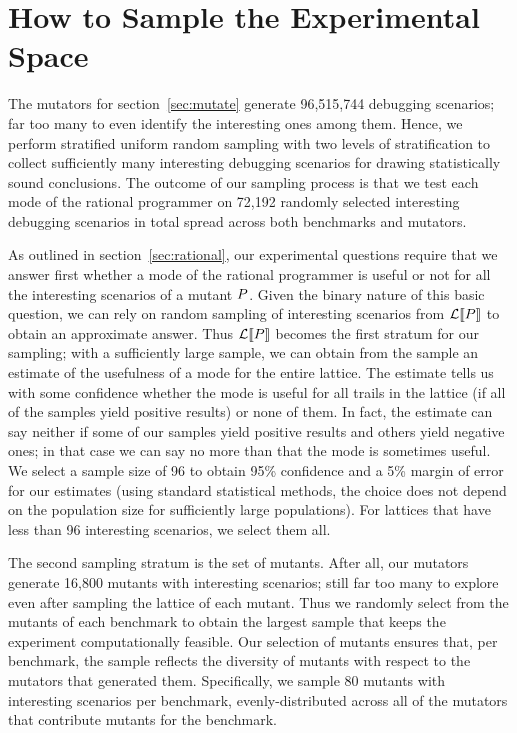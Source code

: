 \section{How to Sample the Experimental Space} 

The mutators for section~\ref{sec:mutate} generate 96,515,744 debugging scenarios; 
far too many to even identify the interesting ones among
them. Hence, we perform stratified uniform random sampling with two
levels of stratification to collect sufficiently many interesting
debugging scenarios for drawing statistically sound conclusions. 
The outcome of our sampling process is that we test each mode of the
rational programmer on 72,192 randomly selected interesting debugging
scenarios in total spread across both benchmarks and mutators.



As outlined in section~\ref{sec:rational}, our experimental questions
require that we answer first whether a mode of the rational programmer is
useful or not for all the interesting scenarios of a mutant $P$.
Given the binary nature of this basic question, we can rely on random
sampling of interesting scenarios from $\mathcal{L}\llbracket P\rrbracket$ to obtain an
approximate answer.  Thus $\mathcal{L}\llbracket P\rrbracket$ becomes the first stratum
for our sampling; with a sufficiently large sample, we can obtain from the
sample an estimate of the usefulness of a mode for the entire lattice.
The estimate tells us with some confidence whether the mode is useful for all trails in the lattice (if all of the samples yield positive results) or none of them.
In fact, the estimate can say neither if some of our samples yield positive results and others yield negative ones; in that case we can say no more than that the mode is sometimes useful.
We select a sample size of 96 to obtain 95\% confidence and a 5\% margin of error for our estimates
(using standard statistical methods, the choice does not depend on the population size for sufficiently large populations).
For lattices that have less than 96 interesting scenarios, we select them all.

The second sampling stratum is the set of mutants. After all, our mutators
generate 16,800 mutants with interesting scenarios; still far too many to
explore even after sampling the lattice of each mutant. Thus we randomly
select from the mutants of each benchmark to obtain the largest
sample that keeps the experiment computationally feasible.
Our selection of mutants ensures that, per benchmark, the sample reflects the diversity of mutants with
respect to the mutators that generated them.  Specifically,  we sample 80
mutants with interesting scenarios per benchmark,  evenly-distributed
across all of the mutators that contribute mutants for the benchmark.



